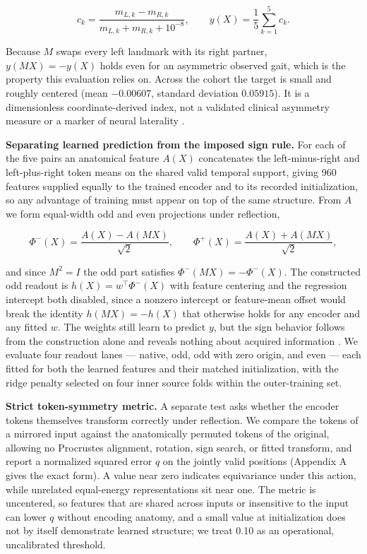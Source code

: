 \documentclass{article}
\begin{document}
\[
c_k = \frac{m_{L,k} - m_{R,k}}{m_{L,k} + m_{R,k} + 10^{-8}},
\qquad
y(X) = \frac{1}{5}\sum_{k=1}^{5} c_k .
\]

Because \(M\) swaps every left landmark with its right partner,
\(y(MX) = -y(X)\) holds even for an asymmetric observed gait, which is
the property this evaluation relies on. Across the cohort the target is
small and roughly centered (mean \(-0.00607\), standard deviation
\(0.05915\)). It is a dimensionless coordinate-derived index, not a
validated clinical asymmetry measure or a marker of neural laterality
\citep{patterson2010symmetry}.

\textbf{Separating learned prediction from the imposed sign rule.} For
each of the five pairs an anatomical feature \(A(X)\) concatenates the
left-minus-right and left-plus-right token means on the shared valid
temporal support, giving 960 features supplied equally to the trained
encoder and to its recorded initialization, so any advantage of training
must appear on top of the same structure. From \(A\) we form equal-width
odd and even projections under reflection,

\[
\Phi^-(X) = \frac{A(X) - A(MX)}{\sqrt{2}},
\qquad
\Phi^+(X) = \frac{A(X) + A(MX)}{\sqrt{2}},
\]

and since \(M^2 = I\) the odd part satisfies
\(\Phi^-(MX) = -\Phi^-(X)\). The constructed odd readout is
\(h(X) = w^\top \Phi^-(X)\) with feature centering and the regression
intercept both disabled, since a nonzero intercept or feature-mean
offset would break the identity \(h(MX) = -h(X)\) that otherwise holds
for any encoder and any fitted \(w\). The weights still learn to predict
\(y\), but the sign behavior follows from the construction alone and
reveals nothing about acquired information
\citep{cohen2016gcnn, puny2022frame}. We evaluate four readout lanes ---
native, odd, odd with zero origin, and even --- each fitted for both the
learned features and their matched initialization, with the ridge
penalty selected on four inner source folds within the outer-training
set.

\textbf{Strict token-symmetry metric.} A separate test asks whether the
encoder tokens themselves transform correctly under reflection. We
compare the tokens of a mirrored input against the anatomically permuted
tokens of the original, allowing no Procrustes alignment, rotation, sign
search, or fitted transform, and report a normalized squared error \(q\)
on the jointly valid positions (Appendix A gives the exact form). A
value near zero indicates equivariance under this action, while
unrelated equal-energy representations sit near one. The metric is
uncentered, so features that are shared across inputs or insensitive to
the input can lower \(q\) without encoding anatomy, and a small value at
initialization does not by itself demonstrate learned structure; we
treat 0.10 as an operational, uncalibrated threshold.
\end{document}
